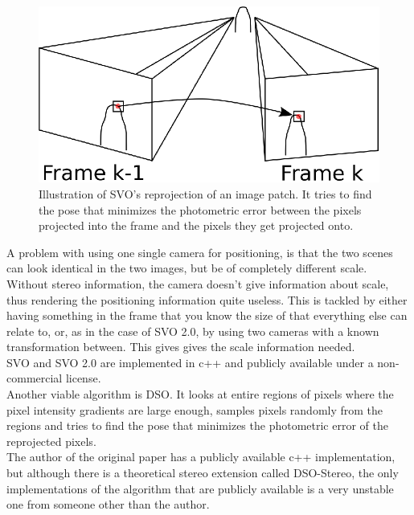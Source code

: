 \begin{figure}
    \centering
    \includegraphics[width=0.8\linewidth]{0_Images/3_Background/SVO.eps}
    \caption[Illustration of SVO's reprojection of an image patch.]
    {Illustration of SVO's reprojection of an image patch. It tries to find the pose that minimizes the photometric error between the pixels projected into the frame and the pixels they get projected onto.}
    \label{Fig:SVO}
\end{figure}

A problem with using one single camera for positioning, is that the two scenes can look identical in the two images, but be of completely different scale. Without stereo information, the camera doesn't give information about scale, thus rendering the positioning information quite useless. This is tackled by either having something in the frame that you know the size of that everything else can relate to, or, as in the case of SVO 2.0, by using two cameras with a known transformation between. This gives gives the scale information needed. \\

SVO and SVO 2.0 are implemented in c++ and publicly available under a non-commercial license. \\

Another viable algorithm is DSO\cite{DSO}. It looks at entire regions of pixels where the pixel intensity gradients are large enough, samples pixels randomly from the regions and tries to find the pose that minimizes the photometric error of the reprojected pixels. \\

The author of the original paper has a publicly available c++ implementation, but although there is a theoretical stereo extension called DSO-Stereo\cite{DSOStereo}, the only implementations of the algorithm that are publicly available is a very unstable one from someone other than the author. \\

